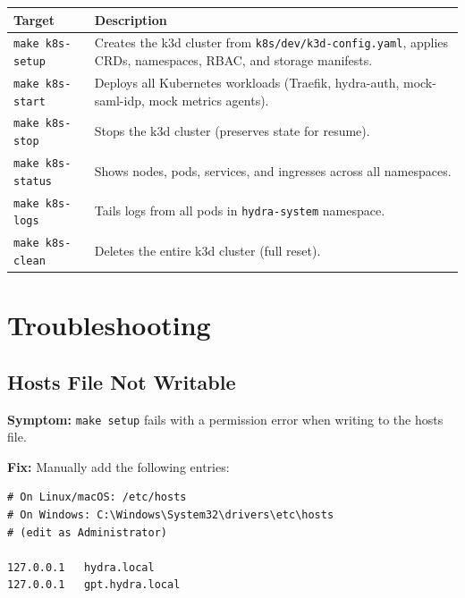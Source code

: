 \documentclass[11pt,a4paper]{article}
\newcommand{\cmdref}[1]{\texttt{#1}}
\begin{document}
\begin{center}
\begin{tabularx}{\textwidth}{l X}
    \toprule
    \textbf{Target} & \textbf{Description} \\
    \midrule
    \texttt{make k8s-setup} &
        Creates the k3d cluster from \texttt{k8s/dev/k3d-config.yaml},
        applies CRDs, namespaces, RBAC, and storage manifests. \\
    \addlinespace
    \texttt{make k8s-start} &
        Deploys all Kubernetes workloads (Traefik, hydra-auth, mock-saml-idp,
        mock metrics agents). \\
    \addlinespace
    \texttt{make k8s-stop} &
        Stops the k3d cluster (preserves state for resume). \\
    \addlinespace
    \texttt{make k8s-status} &
        Shows nodes, pods, services, and ingresses across all namespaces. \\
    \addlinespace
    \texttt{make k8s-logs} &
        Tails logs from all pods in \texttt{hydra-system} namespace. \\
    \addlinespace
    \texttt{make k8s-clean} &
        Deletes the entire k3d cluster (full reset). \\
    \bottomrule
\end{tabularx}
\end{center}

\section{Troubleshooting}
\label{sec:troubleshooting}

\subsection{Hosts File Not Writable}

\textbf{Symptom:} \cmdref{make setup} fails with a permission error when
writing to the hosts file.

\textbf{Fix:} Manually add the following entries:

\begin{lstlisting}[style=bash]
# On Linux/macOS: /etc/hosts
# On Windows: C:\Windows\System32\drivers\etc\hosts
# (edit as Administrator)

127.0.0.1   hydra.local
127.0.0.1   gpt.hydra.local
\end{lstlisting}
\end{document}
